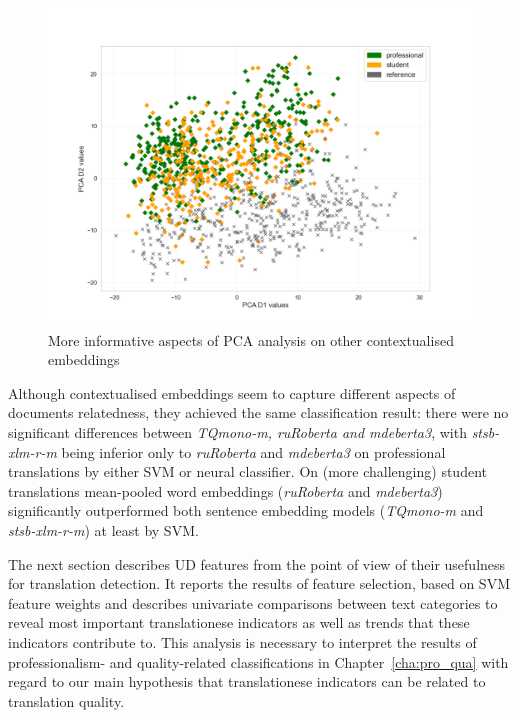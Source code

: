 \begin{figure}[H]
\begin{minipage}[c]{0.31\linewidth}
	\includegraphics[width=\linewidth]{figures/pca/var-ttype-ruRoberta-large-PCA-scatter}
\end{minipage}
\caption{\label{fig:other}More informative aspects of PCA analysis on other contextualised embeddings}	
\end{figure}


Although contextualised embeddings seem to capture different aspects of documents relatedness, they achieved the same classification result: there were no significant differences between \textit{TQmono-m, ruRoberta and mdeberta3}, with \textit{stsb-xlm-r-m} being inferior only to \textit{ruRoberta} and \textit{mdeberta3} on professional translations by either SVM or neural classifier. 
On (more challenging) student translations mean-pooled word embeddings (\textit{ruRoberta} and \textit{mdeberta3}) significantly outperformed both sentence embedding models (\textit{TQmono-m} and \textit{stsb-xlm-r-m}) at least by SVM.

The next section describes UD features from the point of view of their usefulness for translation detection. It reports the results of feature selection, based on SVM feature weights and describes univariate comparisons between text categories to reveal most important translationese indicators as well as trends that these indicators contribute to. This analysis is necessary to interpret the results of professionalism- and quality-related classifications in Chapter~\ref{cha:pro_qua} with regard to our main hypothesis that translationese indicators can be related to translation quality.


